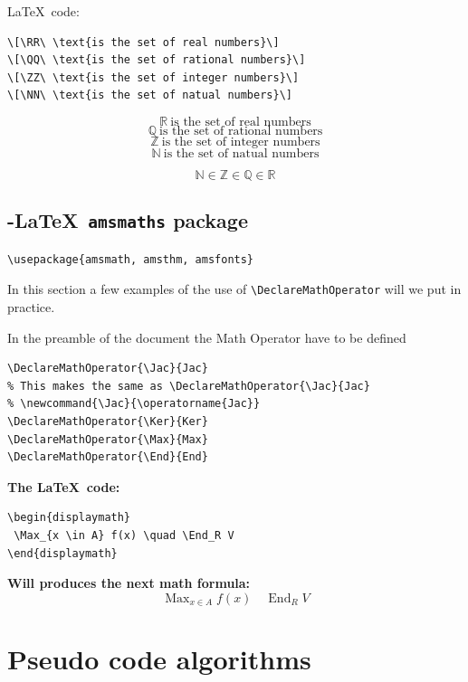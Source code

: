 \documentclass[12pt,a4paper]{article}
\theoremstyle{definition}
\theoremstyle{remark}
\def\RR{\mathbb{R}}
\def\ZZ{\mathbb{Z}}
\def\QQ{\mathbb{Q}}
\def\NN{\mathbb{N}}
\DeclareMathOperator{\Jac}{Jac}
\DeclareMathOperator{\Ker}{Ker}
\DeclareMathOperator{\Max}{Max}
\DeclareMathOperator{\End}{End}
\begin{document}
\LaTeX \ code:
\begin{verbatim}
\[\RR\ \text{is the set of real numbers}\]
\[\QQ\ \text{is the set of rational numbers}\]
\[\ZZ\ \text{is the set of integer numbers}\]
\[\NN\ \text{is the set of natual numbers}\]
\end{verbatim}


\[\RR\ \text{is the set of real numbers}\]
\[\QQ\ \text{is the set of rational numbers}\]
\[\ZZ\ \text{is the set of integer numbers}\]
\[\NN\ \text{is the set of natual numbers}\]

\[\NN \in \ZZ \in \QQ \in \RR\]


\subsection{\AmS-\LaTeX \texttt{ amsmaths} package}\label{sec:nothing}
\begin{verbatim}
\usepackage{amsmath, amsthm, amsfonts}
\end{verbatim}

In this section a few examples of the use of 
\verb|\DeclareMathOperator| will we put in practice.

In the preamble of the document the Math Operator have to be defined 
\begin{verbatim}
\DeclareMathOperator{\Jac}{Jac}
% This makes the same as \DeclareMathOperator{\Jac}{Jac}
% \newcommand{\Jac}{\operatorname{Jac}}
\DeclareMathOperator{\Ker}{Ker}
\DeclareMathOperator{\Max}{Max}
\DeclareMathOperator{\End}{End}
\end{verbatim}

\bigskip
\begin{minipage}[t]{0.55\textwidth}
\textbf{The \LaTeX \ code:}
\begin{verbatim}
\begin{displaymath}
 \Max_{x \in A} f(x) \quad \End_R V 
\end{displaymath}
\end{verbatim}
\end{minipage}
\vline\hfill
\begin{minipage}[t]{0.35\textwidth}
\textbf{Will produces the next math formula:}
\begin{displaymath}
 \Max_{x \in A} f(x) \quad \End_R V 
\end{displaymath}
\end{minipage}

\newpage
\section{Pseudo code algorithms}\label{sec:pseudo_code}
\end{document}
